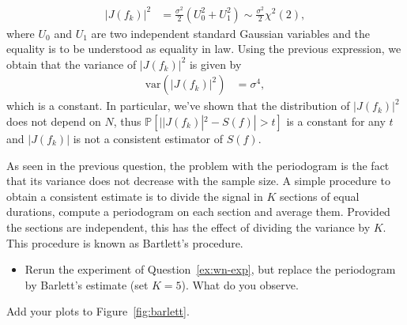 \documentclass[11pt]{article}
\begin{document}
\begin{solution}
\begin{equation}
        \begin{split}
            |J(f_k)|^2 &= \frac{\sigma^2}{2}(U_0^2 + U_1^2)\sim \frac{\sigma^2}{2}\chi^2(2),
        \end{split}
    \end{equation}
    where $U_0$ and $U_1$ are two independent standard Gaussian variables and the equality is to be understood as equality in law.
    Using the previous expression, we obtain that the variance of $|J(f_k)|^2$ is given by
    \begin{equation}
        \begin{split}
            \text{var}(|J(f_k)|^2) &= \sigma^4,
        \end{split}
    \end{equation}
    which is a constant. In particular, we've shown that the distribution of $|J(f_k)|^2$ does not depend on $N$, thus $ \mathbb{P}[||J(f_k)|^2-S(f)|>t]$ is a constant for any $t$ and $|J(f_k)|$ is not a consistent estimator of $S(f)$.
\end{solution}

\begin{exercise}\label{q:barlett}
    As seen in the previous question, the problem with the periodogram is the fact that its variance does not decrease with the sample size.
    A simple procedure to obtain a consistent estimate is to divide the signal in $K$ sections of equal durations, compute a periodogram on each section and average them.
    Provided the sections are independent, this has the effect of dividing the variance by $K$. 
    This procedure is known as Bartlett's procedure.
    \begin{itemize}
        \item Rerun the experiment of Question~\ref{ex:wn-exp}, but replace the periodogram by Barlett's estimate (set $K=5$). What do you observe.
    \end{itemize}
    Add your plots to Figure~\ref{fig:barlett}.
\end{exercise}

\end{document}
